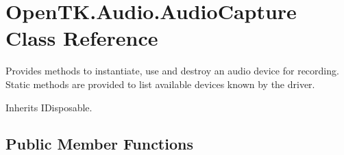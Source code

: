\hypertarget{class_open_t_k_1_1_audio_1_1_audio_capture}{\section{Open\-T\-K.\-Audio.\-Audio\-Capture Class Reference}
\label{class_open_t_k_1_1_audio_1_1_audio_capture}
}


Provides methods to instantiate, use and destroy an audio device for recording. Static methods are provided to list available devices known by the driver.  




Inherits I\-Disposable.

\subsection*{Public Member Functions}
